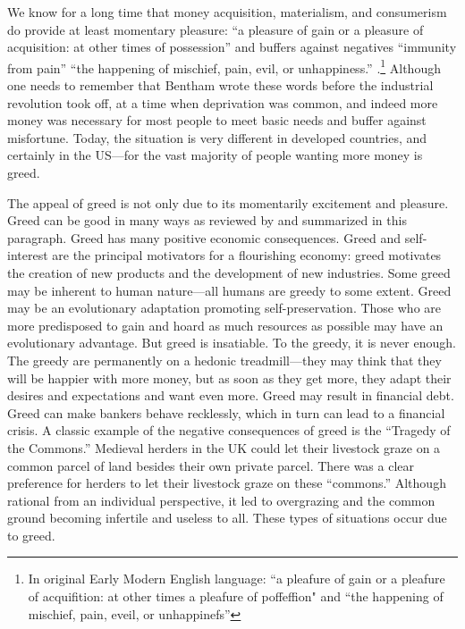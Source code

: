 \documentclass[10pt, letterpaper]{article}
\begin{document}
\begin{spacing}{1.8}






We know for a long time that money acquisition, materialism, and consumerism do provide at least momentary pleasure: ``a pleasure of gain or a pleasure of
acquisition: at other times of possession'' and buffers against negatives
``immunity from pain'' ``the happening of mischief, pain, evil, or
unhappiness.'' \citep[Bentham cited in ][]{cummins2019jeremy}.\footnote{In original Early Modern English language: ``a pleafure of gain or a pleafure of acquifition: at other times a pleafure of poffeffion" and ``the happening of mischief, pain, eveil, or unhappinefs''}
Although one needs to remember that Bentham wrote these words before the industrial revolution took off, at a time when deprivation was common, and
indeed more money was necessary for most people to meet basic needs and buffer
against misfortune. Today, the situation is very different in developed
countries, and certainly in the US---for the vast majority of people wanting more money is greed. 


The appeal of greed is not only due to its momentarily excitement and pleasure. 
Greed can be good in many ways as reviewed by \citet{seuntjens15b} and
summarized in this paragraph. Greed has many positive economic consequences. Greed and self-interest are the principal motivators for a flourishing economy: greed motivates the creation of new
products and the development of new industries. 
Some greed may be inherent to human nature---all humans are greedy to some extent. %
Greed may be an evolutionary adaptation promoting self-preservation. Those who are more predisposed to gain and hoard as much resources as possible may have an
evolutionary advantage. %
%
 But greed is insatiable. To the greedy, it is never enough. The greedy are permanently on a hedonic treadmill---they may think that they will be happier
with more money, but as soon as they get more, they adapt their desires and expectations and want even more.
%
Greed may result in financial debt. Greed can make  bankers behave recklessly, which in turn can lead to a financial crisis. A classic example of the
negative consequences of greed is the ``Tragedy of the Commons.'' Medieval herders in the UK could let their livestock graze on a common parcel of land besides their own private parcel. There was a clear preference
for herders to let their livestock graze on these ``commons.'' Although rational from an
individual perspective, it led to overgrazing and the common ground becoming infertile and useless to all.  These types of situations occur due to greed.


\end{spacing}
\end{document}
